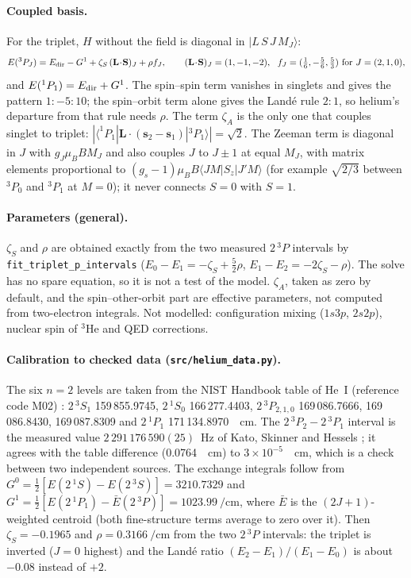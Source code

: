 \paragraph{Coupled basis.} For the triplet, $H$ without the field is diagonal in $|L\,S\,J\,M_J\rangle$:
\begin{equation}
E(^3P_J)=E_{\rm dir}-G^1+\zeta_S\,(\mathbf L\!\cdot\!\mathbf S)_J+\rho f_J,\qquad(\mathbf L\!\cdot\!\mathbf S)_J=(1,-1,-2),\ \ f_J=(\tfrac16,-\tfrac56,\tfrac53)\ \text{for}\ J=(2,1,0),
\end{equation}
and $E(^1P_1)=E_{\rm dir}+G^1$. The spin--spin term vanishes in singlets and gives the pattern $1:-5:10$; the spin--orbit term alone gives the Land\'e rule $2:1$, so helium's departure from that rule needs $\rho$. The term $\zeta_A$ is the only one that couples singlet to triplet: $|\langle^1P_1|\mathbf L\!\cdot\!(\mathbf s_2-\mathbf s_1)|^3P_1\rangle|=\sqrt2$. The Zeeman term is diagonal in $J$ with $g_J\mu_BBM_J$ and also couples $J$ to $J\pm1$ at equal $M_J$, with matrix elements proportional to $(g_s-1)\mu_BB\langle J M|S_z|J'M\rangle$ (for example $\sqrt{2/3}$ between $^3P_0$ and $^3P_1$ at $M=0$); it never connects $S=0$ with $S=1$.

\paragraph{Parameters (general).} $\zeta_S$ and $\rho$ are obtained exactly from the two measured $2\,^3P$ intervals by \texttt{fit\_triplet\_p\_intervals} ($E_0-E_1=-\zeta_S+\tfrac52\rho$, $E_1-E_2=-2\zeta_S-\rho$). The solve has no spare equation, so it is not a test of the model. $\zeta_A$, taken as zero by default, and the spin--other-orbit part are effective parameters, not computed from two-electron integrals. Not modelled: configuration mixing ($1s3p$, $2s2p$), nuclear spin of $^3$He and QED corrections.

\paragraph{Calibration to checked data (\texttt{src/helium\_data.py}).} The six $n=2$ levels are taken from the NIST Handbook table of He~I (reference code M02) \cite{nisthe}: $2\,^3S_1$ 159\,855.9745, $2\,^1S_0$ 166\,277.4403, $2\,^3P_{2,1,0}$ 169\,086.7666, 169\,086.8430, 169\,087.8309 and $2\,^1P_1$ 171\,134.8970~\si{\per\centi\metre}. The $2\,^3P_2-2\,^3P_1$ interval is the measured value $2\,291\,176\,590(25)$~Hz of Kato, Skinner and Hessels \cite{kato}; it agrees with the table difference (0.0764~\si{\per\centi\metre}) to $3\times10^{-5}$~\si{\per\centi\metre}, which is a check between two independent sources. The exchange integrals follow from $G^0=\tfrac12[E(2\,^1S)-E(2\,^3S)]=3210.7329$ and $G^1=\tfrac12[E(2\,^1P_1)-\bar E(2\,^3P)]=1023.99~\si{\per\centi\metre}$, where $\bar E$ is the $(2J+1)$-weighted centroid (both fine-structure terms average to zero over it). Then $\zeta_S=-0.1965$ and $\rho=0.3166~\si{\per\centi\metre}$ from the two $2\,^3P$ intervals: the triplet is inverted ($J=0$ highest) and the Land\'e ratio $(E_2-E_1)/(E_1-E_0)$ is about $-0.08$ instead of $+2$.


